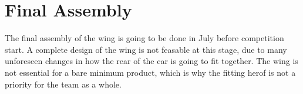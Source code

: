   \section{Final Assembly}

    The final assembly of the wing is going to be done in July before competition start. A complete design of the wing is not feasable at this stage, due to many unforeseen changes in how the rear of the car is going to fit together. The wing is not essential for a bare minimum product, which is why the fitting herof is not a priority for the team as a whole.
